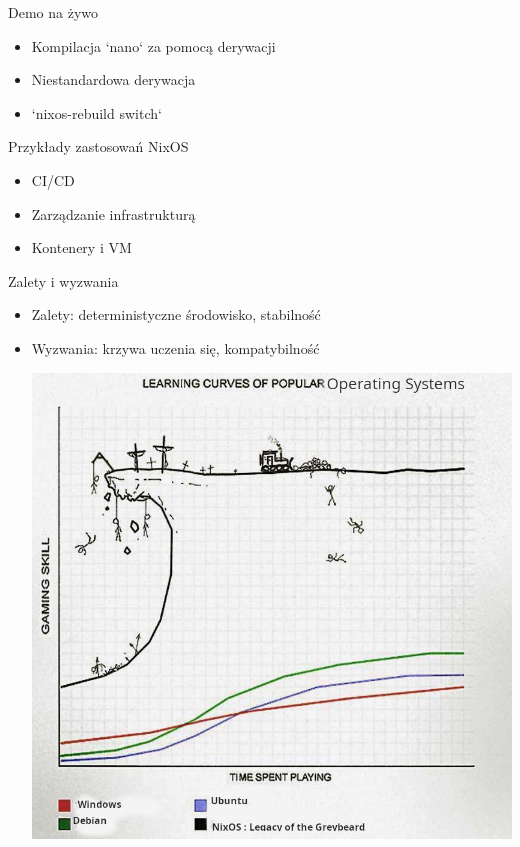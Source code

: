 \documentclass{beamer}
\begin{document}
\begin{frame}{Demo na żywo}
    \begin{itemize}
        \item Kompilacja `nano` za pomocą derywacji
        \item Niestandardowa derywacja
        \item `nixos-rebuild switch`
    \end{itemize}
\end{frame}

\begin{frame}{Przykłady zastosowań NixOS}
    \begin{itemize}
        \item CI/CD
        \item Zarządzanie infrastrukturą
        \item Kontenery i VM
    \end{itemize}
\end{frame}

\begin{frame}{Zalety i wyzwania}
    \begin{itemize}
        \item Zalety: deterministyczne środowisko, stabilność
        \item Wyzwania: krzywa uczenia się, kompatybilność
        \begin{frame}
          \centering
          \includegraphics[width=\linewidth, height=0.8\textheight]{./assets/nixoscurve.jpg}
        \end{frame}
    \end{itemize}
\end{frame}
\end{document}
